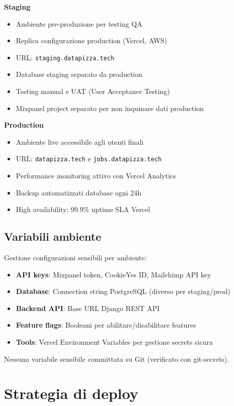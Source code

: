 \textbf{Staging}
\begin{itemize}
  \item Ambiente pre-produzione per testing QA
  \item Replica configurazione production (Vercel, AWS)
  \item URL: \texttt{staging.datapizza.tech}
  \item Database staging separato da production
  \item Testing manual e UAT (User Acceptance Testing)
  \item Mixpanel project separato per non inquinare dati production
\end{itemize}

\textbf{Production}
\begin{itemize}
  \item Ambiente live accessibile agli utenti finali
  \item URL: \texttt{datapizza.tech} e \texttt{jobs.datapizza.tech}
  \item Performance monitoring attivo con Vercel Analytics
  \item Backup automatizzati database ogni 24h
  \item High availability: 99.9\% uptime SLA Vercel
\end{itemize}

\subsection{Variabili ambiente}
Gestione configurazioni sensibili per ambiente:

\begin{itemize}
  \item \textbf{API keys}: Mixpanel token, CookieYes ID, Mailchimp API key
  \item \textbf{Database}: Connection string PostgreSQL (diverso per 
        staging/prod)
  \item \textbf{Backend API}: Base URL Django REST API
  \item \textbf{Feature flags}: Booleani per abilitare/disabilitare 
        features
  \item \textbf{Tools}: Vercel Environment Variables per gestione 
        secrets sicura
\end{itemize}

Nessuna variabile sensibile committata su Git (verificato con git-secrets).

\section{Strategia di deploy}
